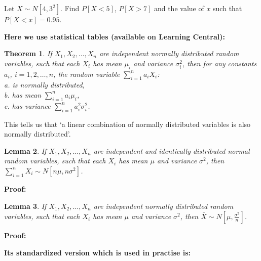 \documentclass[12pt]{article}
\newtheorem{theorem}{Theorem}[section]
\newtheorem{lemma}[theorem]{Lemma}
\newenvironment{example}[1][Example:]{\begin{trivlist}
\item[\hskip \labelsep {\bfseries #1}]}{\end{trivlist}}
\begin{document}
\begin{example}
Let $X \sim N[4,3^2]$. Find $P[X<5]$, $P[X>7]$ and the value of $x$ such that\\ $P[X<x]=0.95$.
\end{example}
\begin{mdframed}
{\bf Here we use statistical tables (available on Learning Central):}
\textcolor[rgb]{1.00,1.00,1.00}{\lipsum[1-2]}
\end{mdframed}
\begin{theorem}
If $X_{1},X_{2},\ldots,X_{n}$ are independent normally distributed random variables, such that each $X_{i}$ has mean $\mu_{i}$ and variance $\sigma_{i}^{2}$, then for any constants $a_{i}$, $i=1,2,\ldots,n$, the random variable $\displaystyle \sum_{i=1}^{n}a_{i}X_{i}$:\\
a. is normally distributed,\\
b. has mean $\displaystyle \sum_{i=1}^{n}a_{i}\mu_{i}$,\\
c. has variance $\displaystyle \sum_{i=1}^{n}a_{i}^{2}\sigma_{i}^{2}$.
\end{theorem}
This tells us that `a linear combination of normally distributed variables is also normally distributed'.

\begin{lemma}
If $X_{1},X_{2},\ldots,X_{n}$ are independent and identically distributed normal random variables, such that each $X_{i}$ has mean $\mu$ and variance $\sigma^{2}$, then $\displaystyle \sum_{i=1}^{n}X_{i} \sim N\left[n\mu, n\sigma^2\right]$.
\end{lemma}

\begin{mdframed}
{\bf Proof:}
\textcolor[rgb]{1.00,1.00,1.00}{\lipsum[1]}
\end{mdframed}

\begin{lemma}
If $X_{1},X_{2},\ldots,X_{n}$ are independent normally distributed random variables, such that each $X_{i}$ has mean $\mu$ and variance $\sigma^{2}$, then $\displaystyle \bar{X} \sim N\left[\mu, \frac{\sigma^{2}}{n}\right]$.
\end{lemma}

\begin{mdframed}
{\bf Proof:}
\textcolor[rgb]{1.00,1.00,1.00}{\lipsum[1]}
\end{mdframed}

\begin{mdframed}
{\bf Its standardized version which is used in practise is:}
\textcolor[rgb]{1.00,1.00,1.00}{\lipsum[1-2]}
\end{mdframed}
\end{document}
